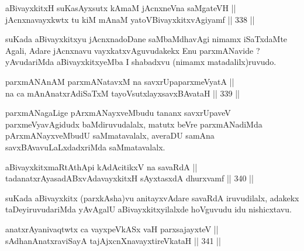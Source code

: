 \begin{shl}
aBivayxkitxH suKasAyxsutx kAmaM jAcnxneVna saMgateVH || \\
\footnotemark[2]jAcnxnavayxkwtx tu kiM mAnaM yatoV\s BivayxkitxvAgiyamf \hfill || 338 ||  
\end{shl}

\begin{artha}
suKada aBivayxkitxyu jAcnxnadoDane saMbaMdhavAgi nimamx
iSaTxdaMte Agali, Adare jAcnxnavu vayxkatxvAguvudakekx Enu
parxmANavide ? yAvudariMda aBivayxkitxyeMba I shabadxvu (nimamx
matadalilx)ruvudo. 
\end{artha}


\begin{shl}
parxmANAnAM parxmANatavxM na savxrUpaparxmeVyatA || \\
na ca mAnAnatxrAdiSaTxM tayoVsutxlayxsavxBAvataH \hfill || 339 ||  
\end{shl}

\begin{artha}
parxmANagaLige pArxmANayxveMbudu tananx savxrUpaveV parxmeVyavAgidudx
baMdiruvudalalx, matutx beVre parxmANadiMda pArxmANayxveMbudU
saMmatavalalx, averaDU samAna savxBAvavuLaLxdadxriMda saMmatavalalx.
\end{artha}


\begin{shl}
aBivayxkitxmaRtA\s thApi kAdAcitikxV na savaRdA || \\
tadanatxrAyasadABxvAdavayxkitxH sAyxtasxdA dhurxvamf \hfill || 340 ||  
\end{shl}

\begin{artha}
suKada aBivayxkitx (parxkAsha)vu anitayxvAdare savaRdA iruvudilalx,
adakekx taDeyiruvudariMda yAvAgalU aBivayxkitxyilalxde hoVguvudu idu nishicxtavu.
\end{artha}


\begin{shl}
anatxrAyanivaqtwtx ca vayxpeVkASx vaH parxsajayxteV ||  \\
sAdhanAnatxraviSayA tajAjxcnXnavayxtireVkataH \hfill || 341 ||  
\end{shl}

